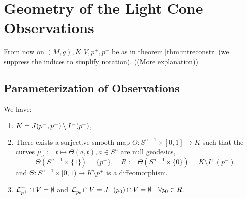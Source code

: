 \section{Geometry of the Light Cone Observations}
From now on $(M,g), K, V, p^+,p^-$ be as in theorem \ref{thm:intreconstr} (we suppress the indices to simplify notation). ((More explanation))

\subsection{Parameterization of Observations}
\begin{lemma}\label{lem:Kcharact}
    We have:
    \begin{enumerate}[label={\textnormal{(\arabic*)}}]
        \item $K=J(p^-,p^+)\setminus I^-(p^+)$,
        \item There exists a surjective smooth map $\Theta:S^{n-1}\times[0,1] \to K$ such that the curves $\mu_a:=t\mapsto\Theta(a,t), a\in S^n$ are null geodesics, 
        \[\Theta(S^{n-1}\times\{1\}) = \{p^+\}, \quad R:=\Theta(S^{n-1}\times\{0\}) = K \setminus I^+(p^-)\]
        and $\Theta:S^{n-1}\times[0,1)\to K\setminus p^+$ is a diffeomorphism.
        \item $\mathcal{L}^-_{p^+}\cap V = \emptyset$ and $\mathcal{L}^-_{p_0} \cap V = J^-(p_0) \cap V = \emptyset \quad \forall p_0\in R$.
    \end{enumerate}
\end{lemma}
